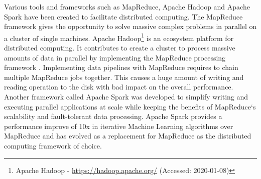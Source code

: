 Various tools and frameworks such as MapReduce, Apache Hadoop and Apache Spark have been created to facilitate distributed computing.
The MapReduce\cite{Dean2004MapReduce} framework gives the opportunity to solve massive complex problems in parallel on a cluster of single machines.
Apache Hadoop\footnote{Apache Hadoop - \url{https://hadoop.apache.org/} (Accessed: 2020-01-08)} is an ecosystem platform for distributed computing. It contributes to create a cluster to process massive amounts of data in parallel by implementing the MapReduce processing framework \cite{Khattak2016BigData}.
Implementing data pipelines with MapReduce requires to chain multiple MapReduce jobs together. This causes a huge amount of writing and reading operation to the disk with bad impact on the overall performance. Another framework called Apache Spark was developed to simplify writing and executing parallel applications at scale while keeping the benefits of MapReduce`s scalability and fault-tolerant data processing. Apache Spark provides a performance improve of 10x in iterative Machine Learning algorithms over MapReduce \cite{Zaharia2010Spark} and has evolved as a replacement for MapReduce as the distributed computing framework of choice.

%
%


